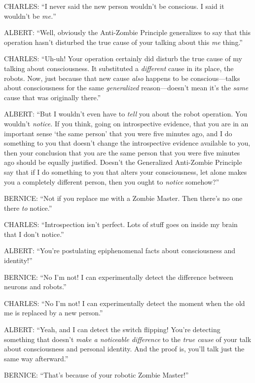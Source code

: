 {
 CHARLES: ``I never said the new person
wouldn't be conscious. I said it
wouldn't be \textit{me.}''}

{
 ALBERT: ``Well, obviously the Anti-Zombie
Principle generalizes to say that this operation hasn't
disturbed the true cause of your talking about this \textit{me}
thing.''}

{
 CHARLES: ``Uh-uh! Your operation certainly did
disturb the true cause of my talking about consciousness. It
substituted a \textit{different} cause in its place, the robots. Now,
just because that new cause \textit{also} happens to be
conscious---talks about consciousness for the same \textit{generalized}
reason---doesn't mean it's the
\textit{same} cause that was originally there.''}

{
 ALBERT: ``But I wouldn't even
have to \textit{tell} you about the robot operation. You
wouldn't \textit{notice.} If you think, going on
introspective evidence, that you are in an important sense
`the same person' that you were five
minutes ago, and I do something to you that doesn't
change the introspective evidence available to you, then your
conclusion that you are the same person that you were five minutes ago
should be equally justified. Doesn't the Generalized
Anti-Zombie Principle say that if I do something to you that alters
your consciousness, let alone makes you a completely different person,
then you ought to \textit{notice} somehow?''}

{
 BERNICE: ``Not if you replace me with a Zombie
Master. Then there's no one there \textit{to}
notice.''}

{
 CHARLES: ``Introspection isn't
perfect. Lots of stuff goes on inside my brain that I
don't notice.''}

{
 ALBERT: ``You're postulating
epiphenomenal facts about consciousness and
identity!''}

{
 BERNICE: ``No I'm not! I can
experimentally detect the difference between neurons and
robots.''}

{
 CHARLES: ``No I'm not! I can
experimentally detect the moment when the old me is replaced by a new
person.''}

{
 ALBERT: ``Yeah, and I can detect the switch
flipping! You're detecting something that
doesn't \textit{make a noticeable difference} to the
\textit{true cause} of your talk about consciousness and personal
identity. And the proof is, you'll talk just the same
way afterward.''}

{
 BERNICE: ``That's because of your
robotic Zombie Master!''}

